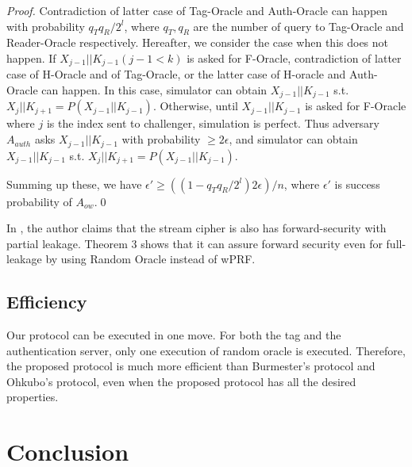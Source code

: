 \documentclass[english]{llncs}
\begin{document}
\begin{proof}
Contradiction of latter case of Tag-Oracle and Auth-Oracle can happen with probability 
$q_T q_R /2^{l}$, where $q_T, q_R$ are the number of query to Tag-Oracle and Reader-Oracle respectively. 
Hereafter, we consider the case when this does not happen.
If $X_{j-1}||K_{j-1} (j-1 < k)$ is asked for F-Oracle, contradiction of latter case of H-Oracle and of Tag-Oracle, or the latter case of
H-oracle and Auth-Oracle can happen. In this case, simulator can obtain $X_{j-1}|| K_{j-1}$ s.t. 
$X_{j}|| K_{j+1} = P(X_{j-1}|| K_{j-1})$.
Otherwise, until $X_{j-1}|| K_{j-1}$ is 
asked for F-Oracle where $j$ is the index sent to challenger, simulation is perfect.
Thus adversary $A_{auth}$ asks $X_{j-1}|| K_{j-1}$ with probability $\ge 2\epsilon$, 
and simulator can obtain $X_{j-1}|| K_{j-1}$ s.t. 
$X_{j}|| K_{j+1} = P(X_{j-1}|| K_{j-1})$.

Summing up these, we have $\epsilon' \ge ((1-q_T q_R/2^{l})2\epsilon)/n$, where 
$\epsilon'$ is success probability of $A_{ow}$.\qed 
\end{proof}

In \cite{P09}, the author claims that the stream cipher is also 
has forward-security with partial leakage.
Theorem 3 shows that it can assure forward security
even for full-leakage by using Random Oracle instead of wPRF.

\subsection{Efficiency}
Our protocol can be executed
in one move. For both the tag and the authentication server, 
only one execution of random oracle is executed.
Therefore, the proposed protocol
is much more efficient than Burmester's protocol and Ohkubo's protocol, 
even when the proposed protocol
has all the desired properties.


\section{Conclusion}
\end{document}
